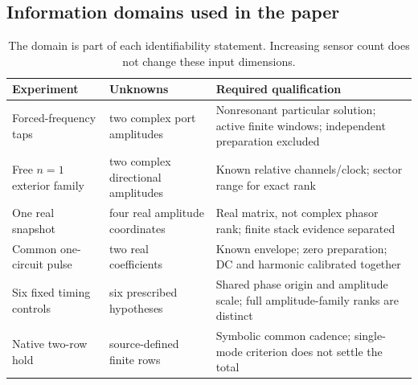 \subsection{Information domains used in the paper}\label{app:domains}
\begin{table}[htbp]\centering\small
\begin{tabular}{P{.28\textwidth}P{.28\textwidth}P{.31\textwidth}}\toprule
Experiment & Unknowns & Required qualification\\\midrule
Forced-frequency taps & two complex port amplitudes & Nonresonant particular solution; active finite windows; independent preparation excluded\\
Free $n=1$ exterior family & two complex directional amplitudes & Known relative channels/clock; sector range for exact rank\\
One real snapshot & four real amplitude coordinates & Real matrix, not complex phasor rank; finite stack evidence separated\\
Common one-circuit pulse & two real coefficients & Known envelope; zero preparation; DC and harmonic calibrated together\\
Six fixed timing controls & six prescribed hypotheses & Shared phase origin and amplitude scale; full amplitude-family ranks are distinct\\
Native two-row hold & source-defined finite rows & Symbolic common cadence; single-mode criterion does not settle the total\\\bottomrule
\end{tabular}
\caption{The domain is part of each identifiability statement. Increasing sensor count does not change these input dimensions.}\label{tab:domains}
\end{table}
